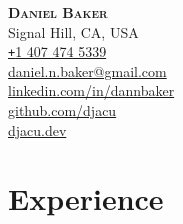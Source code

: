 \documentclass[letterpaper,11pt,empty]{article}
\begin{document}

\begin{flushleft}
    \textbf{\Huge \scshape Daniel Baker} \vspace{0.5em} \\
    \small
    Signal Hill, CA, USA \\
    \href{tel:14074745339}{\texttt{+}1 407 474 5339} \\
    \href{mailto:daniel.n.baker@gmail.com}{daniel.n.baker@gmail.com} \\
    \href{https://www.linkedin.com/in/dannbaker/}{linkedin.com/in/dannbaker} \\
    \href{https://github.com/djacu}{github.com/djacu} \\
    \href{https://djacu.dev/}{djacu.dev}
\end{flushleft}


\section{Experience}
\end{document}

